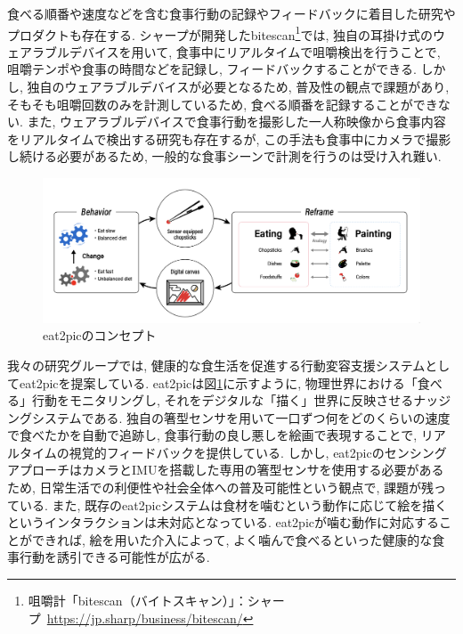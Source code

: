 食べる順番や速度などを含む食事行動の記録やフィードバックに着目した研究やプロダクトも存在する. シャープが開発したbitescan\footnote{咀嚼計「bitescan（バイトスキャン）」：シャープ~\url{https://jp.sharp/business/bitescan/}}では, 独自の耳掛け式のウェアラブルデバイスを用いて, 食事中にリアルタイムで咀嚼検出を行うことで, 咀嚼テンポや食事の時間などを記録し, フィードバックすることができる. しかし, 独自のウェアラブルデバイスが必要となるため, 普及性の観点で課題があり, そもそも咀嚼回数のみを計測しているため, 食べる順番を記録することができない. また, ウェアラブルデバイスで食事行動を撮影した一人称映像から食事内容をリアルタイムで検出する研究も存在するが, この手法も食事中にカメラで撮影し続ける必要があるため, 一般的な食事シーンで計測を行うのは受け入れ難い\cite{10.1145/3551626.3564964}.

\begin{figure}[t]
  \begin{center}
    \includegraphics[clip, width=1.0\hsize]{img/eat2pic-concept.png}
    \caption{eat2picのコンセプト}
    \label{fig:eat2pic-concept}
  \end{center}
\end{figure}

我々の研究グループでは, 健康的な食生活を促進する行動変容支援システムとしてeat2picを提案している\cite{10.1145/3580784}. eat2picは図\ref{fig:eat2pic-concept}に示すように, 物理世界における「食べる」行動をモニタリングし, それをデジタルな「描く」世界に反映させるナッジングシステムである. 独自の箸型センサを用いて一口ずつ何をどのくらいの速度で食べたかを自動で追跡し, 食事行動の良し悪しを絵画で表現することで, リアルタイムの視覚的フィードバックを提供している. しかし, eat2picのセンシングアプローチはカメラとIMUを搭載した専用の箸型センサを使用する必要があるため, 日常生活での利便性や社会全体への普及可能性という観点で, 課題が残っている. また, 既存のeat2picシステムは食材を噛むという動作に応じて絵を描くというインタラクションは未対応となっている. eat2picが噛む動作に対応することができれば, 絵を用いた介入によって, よく噛んで食べるといった健康的な食事行動を誘引できる可能性が広がる.

